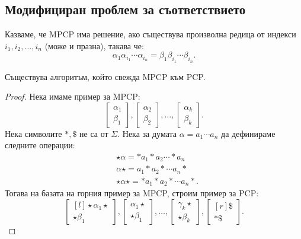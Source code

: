 \subsection*{Модифициран проблем за съответствието }

Казваме, че MPCP има решение, ако съществува произволна редица от индекси $i_1,i_2,\dots,i_n$ (може и празна), такава че:
\[\alpha_1\alpha_{i_1}\cdots\alpha_{i_n} = \beta_1\beta_{i_1}\cdots\beta_{i_n}.\]

\begin{lemma}
  Съществува алгоритъм, който свежда MPCP към PCP.
\end{lemma}
\begin{proof}
  Нека имаме пример за MPCP:
  \[\begin{bmatrix} \alpha_1\\ \beta_1\end{bmatrix},\begin{bmatrix} \alpha_2\\ \beta_2\end{bmatrix},\dots,\begin{bmatrix} \alpha_k\\ \beta_k\end{bmatrix} .\]
  Нека символите $*,\$$ не са от $\Sigma$.
  Нека за думата $\alpha = a_1\cdots a_n$ да дефинираме следните операции:
  \begin{align*}
    & \star\alpha = *a_1*a_2\cdots *a_n\\
    & \alpha\star = a_1*a_2*\cdots a_n*\\
    & \star\alpha\star = * a_1*a_2*\cdots a_n*.
  \end{align*}
  Тогава на базата на горния пример за MPCP, строим пример за PCP:
  \[\begin{bmatrix*}[l] \star\alpha_1\star\\ \star\beta_1\end{bmatrix*},\begin{bmatrix} \alpha_1\star\\ \star \beta_1\end{bmatrix},\dots,\begin{bmatrix} \gamma_k\star\\ \star\beta_k\end{bmatrix},\begin{bmatrix*}[r] \$\\ *\$\end{bmatrix*}.\]
\end{proof}


